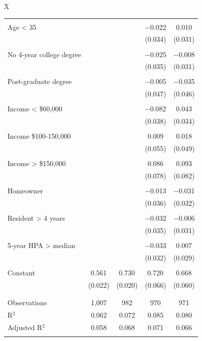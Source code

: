 \documentclass[article,12pt]{memoir}
\begin{document}
\begin{SingleSpacing}
\begin{table}
\begin{threeparttable}
\begin{tabularx}{\linewidth}{X}
\begin{tabular}{@{\extracolsep{5pt}}lcccc}
    & & & & \\ 
   Age < 35 &  &  & $-$0.022 & 0.010 \\ 
    &  &  & (0.034) & (0.031) \\ 
    & & & & \\ 
   No 4-year college degree &  &  & $-$0.025 & $-$0.008 \\ 
    &  &  & (0.035) & (0.031) \\ 
    & & & & \\ 
   Post-graduate degree &  &  & $-$0.005 & $-$0.035 \\ 
    &  &  & (0.047) & (0.046) \\ 
    & & & & \\ 
   Income < \$60,000 &  &  & $-$0.082$^{}$ & 0.043 \\ 
    &  &  & (0.038) & (0.034) \\ 
    & & & & \\ 
   Income \$100-150,000 &  &  & 0.009 & 0.018 \\ 
    &  &  & (0.055) & (0.049) \\ 
    & & & & \\ 
   Income > \$150,000 &  &  & 0.086 & 0.093 \\ 
    &  &  & (0.078) & (0.082) \\ 
    & & & & \\ 
   Homeowner &  &  & $-$0.013 & $-$0.031 \\ 
    &  &  & (0.036) & (0.032) \\ 
    & & & & \\ 
   Resident > 4 years &  &  & $-$0.032 & $-$0.006 \\ 
    &  &  & (0.035) & (0.031) \\ 
    & & & & \\ 
   5-year HPA > median &  &  & $-$0.033 & 0.007 \\ 
    &  &  & (0.032) & (0.029) \\ 
    & & & & \\ 
   Constant & 0.561$^{}$ & 0.730$^{}$ & 0.720$^{}$ & 0.668$^{}$ \\ 
    & (0.022) & (0.020) & (0.066) & (0.060) \\ 
    & & & & \\ 
  \hline \\[-1.8ex] 
  Observations & 1,007 & 982 & 970 & 971 \\ 
  R$^{2}$ & 0.062 & 0.072 & 0.085 & 0.080 \\ 
  Adjusted R$^{2}$ & 0.058 & 0.068 & 0.071 & 0.066 \\ 
  \hline 
  \hline \\[-1.8ex] 
  \end{tabular}   


\end{tabularx}
\end{threeparttable}
\end{table}
\end{SingleSpacing}
\end{document}
